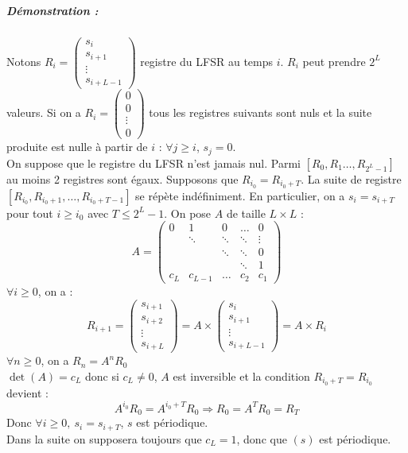\documentclass[12pt,a4paper]{report}
\begin{document}
\subparagraph{Démonstration :\\}
Notons $R_i=\left( \begin{array}{c}
s_i \\
s_{i+1} \\
\vdots \\
s_{i+L-1} \end{array}\right)$ registre du LFSR au temps $i$. $R_i$ peut prendre $2^L$ valeurs. Si on a $R_i = \left( \begin{array}{c}
0 \\
0 \\
\vdots \\
0 \end{array}\right)$ tous les registres suivants sont nuls et la suite produite est nulle à partir de $i$ : $\forall j \geqslant i$, $s_j = 0$.\\
On suppose que le registre du LFSR n'est jamais nul. Parmi $[R_0,R_1 \ldots, R_{2^L-1}]$ au moins 2 registres sont égaux. Supposons que $R_{i_0} = R_{i_0+T}$. La suite de registre $[R_{i_0},R_{i_0+1}, \ldots, R_{i_0+T-1}]$ se répète indéfiniment. En particulier, on a $s_i = s_{i+T}$ pour tout $i \geqslant i_0$ avec $T \leqslant 2^L - 1 $.
On pose $A$ de taille $L \times L$ :
$$ A = \left( \begin{array}{ccccc}
0 & 1 & 0 & \ldots & 0 \\
 & \ddots & \ddots & \ddots & \vdots \\
 &        & \ddots & \ddots & 0 \\
 & & & \ddots & 1 \\
 c_L & c_{L-1} & \ldots & c_2 & c_1 \end{array} \right) $$
 $\forall i \geqslant 0$, on a : $$R_{i+1} = \left( \begin{array}{c}
s_{i+1}\\
s_{i+2} \\
\vdots \\
s_{i+L} \end{array}\right) = A \times \left( \begin{array}{c}
s_i \\
s_{i+1} \\
\vdots \\
s_{i+L-1} \end{array}\right) = A \times R_i$$
$\forall n \geqslant 0$, on a $R_n = A^n R_0$\\
$\det(A) = c_L$ donc si $c_L \neq 0$, $A$ est inversible et la condition $R_{i_0+T}=R_{i_0}$ devient :
$$ A^{i_0} R_0 = A^{i_0+T} R_0 \Rightarrow R_0 = A^TR_0 = R_T$$
Donc $\forall i \geqslant 0,\ s_i = s_{i+T}$, $s$ est périodique.\\
Dans la suite on supposera toujours que $c_L = 1$, donc que $(s)$ est périodique.
\end{document}
